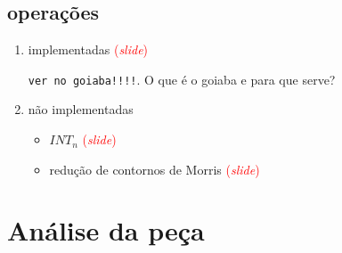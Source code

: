 \documentclass[12pt,a4paper]{article}
\newcommand{\slide}{\textcolor{red}{(\textit{slide})}}
\begin{document}
\subsection{operações}

\begin{enumerate}
\item implementadas \slide{}

  \texttt{ver no goiaba!!!!}. O que é o goiaba e para que serve?
\item não implementadas
  \begin{itemize}
  \item $INT_n$ \slide{}
  \item redução de contornos de Morris \slide{}
  \end{itemize}
\end{enumerate}

\section{Análise da peça}
\end{document}
